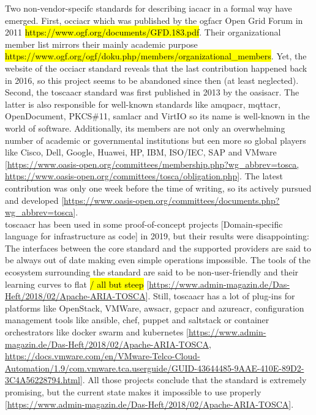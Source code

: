 Two non-vendor-specifc standards for describing \gls{iacacr} in a formal way have emerged. First, \gls{occiacr} which was published by the \gls{ogfacr} Open Grid Forum in 2011 \hl{https://www.ogf.org/documents/GFD.183.pdf}. Their organizational member list mirrors their mainly academic purpose \hl{https://www.ogf.org/ogf/doku.php/members/organizational\_members}. Yet, the website of the \gls{occiacr} standard reveals that the last contribution happened back in 2016, so this project seems to be abandoned since then (at least neglected).
\\
Second, the \gls{toscaacr} standard was first published in 2013 by the \gls{oasisacr}. The latter is also responsible for well-known standards like \gls{amqpacr}, \gls{mqttacr}, OpenDocument, PKCS\#11, \gls{samlacr} and VirtIO so its name is well-known in the world of software. Additionally, its members are not only an overwhelming number of academic or governmental institutions but een more so global players like Cisco, Dell, Google, Huawei, HP, IBM, ISO/IEC, SAP and VMware [\url{https://www.oasis-open.org/committees/membership.php?wg_abbrev=tosca, https://www.oasis-open.org/committees/tosca/obligation.php}]. The latest contribution was only one week before the time of writing, so its actively pursued and developed [\url{https://www.oasis-open.org/committees/documents.php?wg_abbrev=tosca}].
\\
\gls{toscaacr} has been used in some proof-of-concept projects [Domain-specific language for infrastructure as code] in 2019, but their results were disappointing: The interfaces between the core standard and the supported providers are said to be always out of date making even simple operations impossible. The tools of the ecosystem surrounding the standard are said to be non-user-friendly and their learning curves to flat \hl{/ all but steep} [\url{https://www.admin-magazin.de/Das-Heft/2018/02/Apache-ARIA-TOSCA}].
Still, \gls{toscaacr} has a lot of plug-ins for platforms like OpenStack, VMWare, \gls{awsacr}, \gls{gcpacr} and \gls{azureacr}, configuration management tools like ansible, chef, puppet and saltstack or container orchestrators like docker swarm and kubernetes [\url{https://www.admin-magazin.de/Das-Heft/2018/02/Apache-ARIA-TOSCA}, \url{https://docs.vmware.com/en/VMware-Telco-Cloud-Automation/1.9/com.vmware.tca.userguide/GUID-43644485-9AAE-410E-89D2-3C4A56228794.html}].
All those projects conclude that the standard is extremely promising, but the current state makes it impossible to use properly [\url{https://www.admin-magazin.de/Das-Heft/2018/02/Apache-ARIA-TOSCA}].
